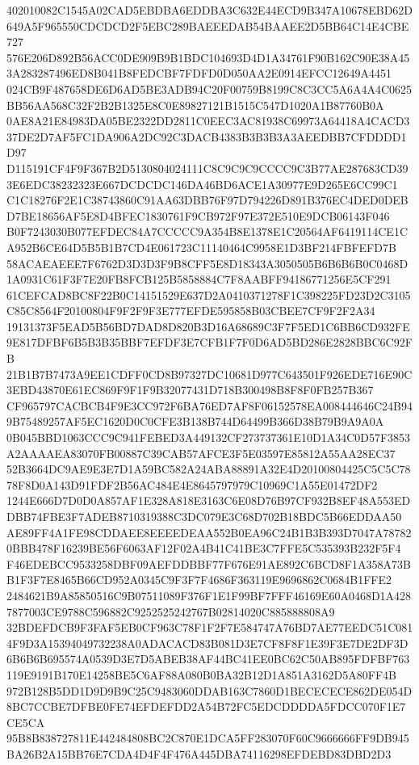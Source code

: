 \documentclass[UTF8,fontset=fandol,zihao=-4,a4paper]{ctexart}
\begin{document}
{{402010082C1545A02CAD5EBDBA6EDDBA3C632E44ECD9B347A10678EBD62D649A5F965550CDCDCD2F5EBC289BAEEEDAB54BAAEE2D5BB64C14E4CBE727
576E206D892B56ACC0DE909B9B1BDC104693D4D1A34761F90B162C90E38A453A283287496ED8B041B8FEDCBF7FDFD0D050AA2E0914EFCC12649A4451
024CB9F487658DE6D6AD5BE3ADB94C20F00759B8199C8C3CC5A6A4A4C0625BB56AA568C32F2B2B1325E8C0E89827121B1515C547D1020A1B87760B0A
0AE8A21E84983DA05BE2322DD2811C0EEC3AC81938C69973A64418A4CACD337DE2D7AF5FC1DA906A2DC92C3DACB4383B3B3B3A3AEEDBB7CFDDDD1D97
D115191CF4F9F367B2D5130804024111C8C9C9C9CCCC9C3B77AE287683CD393E6EDC38232323E667DCDCDC146DA46BD6ACE1A30977E9D265E6CC99C1
C1C18276F2E1C38743860C91AA63DBB76F97D794226D891B376EC4DED0DEBD7BE18656AF5E8D4BFEC1830761F9CB972F97E372E510E9DCB06143F046
B0F7243030B077EFDEC84A7CCCCC9A354B8E1378E1C20564AF6419114CE1CA952B6CE64D5B5B1B7CD4E061723C11140464C9958E1D3BF214FBFEFD7B
58ACAEAEEE7F6762D3D3D3F9B8CFF5E8D18343A3050505B6B6B6B0C0468D1A0931C61F3F7E20FB8FCB125B5858884C7F8AABFF94186771256E5CF291
61CEFCAD8BC8F22B0C14151529E637D2A0410371278F1C398225FD23D2C3105C85C8564F20100804F9F2F9F3E777EFDE595858B03CBEE7CF9F2F2A34
19131373F5EAD5B56BD7DAD8D820B3D16A68689C3F7F5ED1C6BB6CD932FE9E817DFBF6B5B3B35BBF7EFDF3E7CFB1F7F0D6AD5BD286E2828BBC6C92FB
21B1B7B7473A9EE1CDFF0CD8B97327DC10681D977C643501F926EDE716E90C3EBD43870E61EC869F9F1F9B32077431D718B300498B8F8F0FB257B367
CF965797CACBCB4F9E3CC972F6BA76ED7AF8F06152578EA008444646C24B949B75489257AF5EC1620D0C0CFE3B138B744D64499B366D38B79B9A9A0A
0B045BBD1063CCC9C941FEBED3A449132CF273737361E10D1A34C0D57F3853A2AAAAEA83070FB00887C39CAB57AFCE3F5E03597E85812A55AA28EC37
52B3664DC9AE9E3E7D1A59BC582A24ABA88891A32E4D20100804425C5C5C7878F8D0A143D91FDF2B56AC484E4E8645797979C10969C1A55E01472DF2
1244E666D7D0D0A857AF1E328A818E3163C6E08D76B97CF932B8EF48A553EDDBB74FBE3F7ADEB8710319388C3DC079E3C68D702B18BDC5B66EDDAA50
AE89FF4A1FE98CDDAEE8EEEEDEAA552B0EA96C24B1B3B393D7047A787820BBB478F16239BE56F6063AF12F02A4B41C41BE3C7FFE5C535393B232F5F4
F46EDEBCC9533258DBF09AEFDDBBF77F676E91AE892C6BCD8F1A358A73BB1F3F7E8465B66CD952A0345C9F3F7F4686F363119E9696862C0684B1FFE2
2484621B9A85850516C9B07511089F376F1E1F99BF7FFF46169E60A0468D1A4287877003CE9788C596882C9252525242767B02814020C885888808A9
32BDEFDCB9F3FAF5EB0CF963C78F1F2F7E584747A76BD7AE77EEDC51C0814F9D3A15394049732238A0ADACACD83B081D3E7CF8F8F1E39F3E7DE2DF3D
6B6B6B695574A0539D3E7D5ABEB38AF44BC41EE0BC62C50AB895FDFBF763119E9191B170E14258BE5C6AF88A080B0BA32B12D1A851A3162D5A80FF4B
972B128B5DD1D9D9B9C25C9483060DDAB163C7860D1BECECECE862DE054D8BC7CCBE7DFBE0FE74EFDEFDD2A54B72FC5EDCDDDDA5FDCC070F1E7CE5CA
95B8B838727811E442484808BC2C870E1DCA5FF283070F60C9666666FF9DB945BA26B2A15BB76E7CDA4D4F4F476A445DBA74116298EFDEBD83DBD2D3
}}
\end{document}
